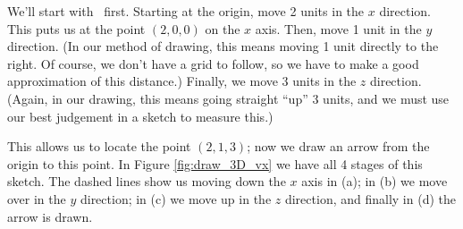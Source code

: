 {We'll start with \vv\ first. Starting at the origin, move 2 units in the $x$ direction. This puts us at the point $(2,0,0)$ on the $x$ axis. Then, move 1 unit in the $y$ direction. (In our method of drawing, this means moving 1 unit directly to the right. Of course, we don't have a grid to follow, so we have to make a good approximation of this distance.) Finally, we move 3 units in the $z$ direction. (Again, in our drawing, this means going straight ``up'' 3 units, and we must use our best judgement in a sketch to measure this.)

This allows us to locate the point $(2,1,3)$; now we draw an arrow from the origin to this point. In Figure \ref{fig:draw_3D_vx} we have all 4 stages of this sketch. The dashed lines show us moving down the $x$ axis in (a); in (b) we move over in the $y$ direction; in (c) we move up in the $z$ direction, and finally in (d) the arrow is drawn.

\begin{myfigure}
\begin{center}
\end{center}
\end{myfigure}}
